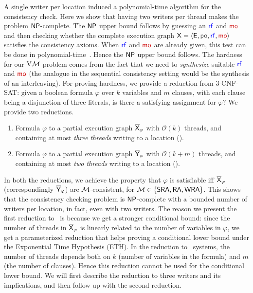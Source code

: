 A single writer per location induced a polynomial-time algorithm for the consistency check. Here we show that having two writers per thread makes the problem $\mathsf{NP}$-complete. The $\mathsf{NP}$ upper bound follows by guessing an $\rf$ and $\mo$ and then checking whether the complete execution graph $\ex = \tuple{\E, \po, \rf, \mo}$ satisfies the consistency axioms. When $\rf$ and $\mo$ are already given, this test can be done in polynomial-time~\cite{Tunc2023}. Hence the $\mathsf{NP}$ upper bound follows. The hardness for our $\mathrm{V}\mathcal{M}$ problem comes from the fact that we need to \emph{synthesize} suitable $\rf$ and $\mo$ (the analogue in the sequential consistency setting would be the synthesis of an interleaving). For proving hardness, we provide a reduction from 3-CNF-SAT: given a boolean formula $\varphi$ over $k$ variables and $m$ clauses, with each clause being a disjunction of three literals, is there a satisfying assignment for $\varphi$?  We provide two reductions.
\begin{enumerate}
\item Formula $\varphi$ to a partial execution graph $\overline{\mathsf{\color{black}X}}_\varphi$ with $\mathcal{O}(k)$ threads, and containing at most \emph{three threads} writing to a location (\threewriter). 
\item Formula $\varphi$ to a partial execution graph $\overline{\mathsf{\color{black}Y}}_\varphi$ with $\mathcal{O}(k + m)$ threads, and containing at most \emph{two threads} writing to a location (\twowriter). 
\end{enumerate}

In both the reductions, we achieve the property that $\varphi$ is satisfiable iff $\overline{\mathsf{\color{black}X}}_\varphi$ (correspondingly $\overline{\mathsf{\color{black}Y}}_\varphi$) are $\mathcal{M}$-consistent, for $\mathcal{M} \in \{\mathsf{SRA}, \mathsf{RA}, \mathsf{WRA}\}$. This shows that the consistency checking problem is $\mathsf{NP}$-complete with a bounded number of writers per location, in fact, even with two writers. The reason we present the first reduction to \threewriter\ is because we get a stronger conditional bound: since the number of threads in $\overline{\mathsf{\color{black}X}}_\varphi$ is linearly related to the number of variables in $\varphi$, we get a parameterized reduction that helps proving a conditional lower bound under the Exponential Time Hypothesis (ETH). In the reduction to \twowriter\ systems, the number of threads depends both on $k$ (number of variables in the formula) and $m$ (the number of clauses). Hence this reduction cannot be used for the conditional lower bound. 
We will first describe the reduction to three writers and its implications, and then follow up with the second reduction. 

